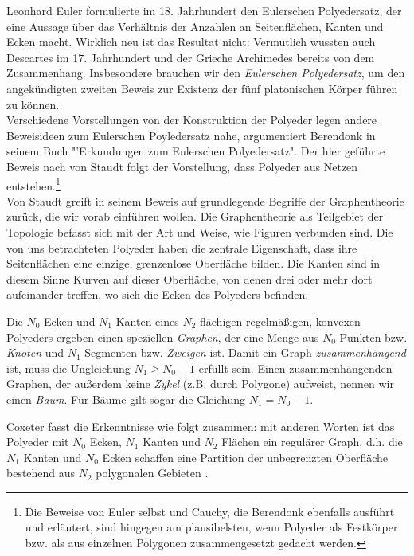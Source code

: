Leonhard Euler formulierte im 18. Jahrhundert den Eulerschen Polyedersatz, der eine Aussage über das Verhältnis der Anzahlen an Seitenflächen, Kanten und Ecken macht. Wirklich neu ist das Resultat nicht: Vermutlich wussten auch Descartes im 17. Jahrhundert und der Grieche Archimedes bereits von dem Zusammenhang. Insbesondere brauchen wir den \textit{Eulerschen Polyedersatz}, um den angekündigten zweiten Beweis zur Existenz der fünf platonischen Körper führen zu können.\\
Verschiedene Vorstellungen von der Konstruktion der Polyeder legen andere Beweisideen zum Eulerschen Poyledersatz nahe, argumentiert Berendonk in seinem Buch "'Erkundungen zum Eulerschen Polyedersatz". \citep[vgl.][39]{Berendonk2014} Der hier geführte Beweis nach von Staudt folgt der Vorstellung, dass Polyeder aus Netzen entstehen.\footnote{Die Beweise von Euler selbst und Cauchy, die Berendonk ebenfalls ausführt und erläutert, sind hingegen am plausibelsten, wenn Polyeder als Festkörper bzw. als aus einzelnen Polygonen zusammengesetzt gedacht werden.}\\
Von Staudt greift in seinem Beweis auf grundlegende Begriffe der Graphentheorie zurück, die wir vorab einführen wollen. Die Graphentheorie als Teilgebiet der Topologie befasst sich mit der Art und Weise, wie Figuren verbunden sind. Die von uns betrachteten Polyeder haben die zentrale Eigenschaft, dass ihre Seitenflächen eine einzige, grenzenlose Oberfläche bilden. Die Kanten sind in diesem Sinne Kurven auf dieser Oberfläche, von denen drei oder mehr dort aufeinander treffen, wo sich die Ecken des Polyeders befinden.
\begin{bem}
Die $N_0$ Ecken und $N_1$ Kanten eines $N_2$-flächigen regelmäßigen, konvexen Polyeders ergeben einen speziellen \textit{Graphen}, der eine Menge aus $N_0$ Punkten bzw. \textit{Knoten} und $N_1$ Segmenten bzw. \textit{Zweigen} ist. Damit ein Graph \textit{zusammenhängend} ist, muss die Ungleichung $N_{1} \geq N_{0}-1$ erfüllt sein.
Einen zusammenhängenden Graphen, der außerdem keine \textit{Zykel} (z.B. durch Polygone) aufweist, nennen wir einen \textit{Baum}. Für Bäume gilt sogar die Gleichung $N_{1} = N_{0}-1$.
\end{bem}
Coxeter fasst die Erkenntnisse wie folgt zusammen: mit anderen Worten ist das Polyeder mit $N_0$ Ecken, $N_1$ Kanten und $N_2$ Flächen ein regulärer Graph, d.h. die $N_1$ Kanten und $N_0$ Ecken schaffen eine Partition der unbegrenzten Oberfläche bestehend aus $N_2$ polygonalen Gebieten \citep[6]{Coxeter1973}.\\
